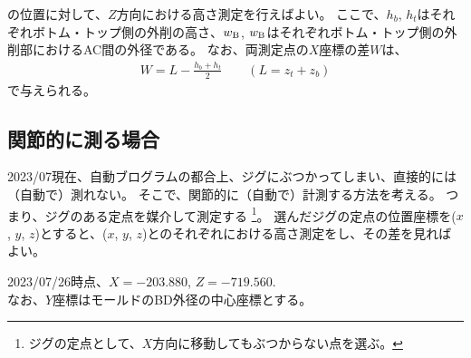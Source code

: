 の位置に対して、$Z$方向における高さ測定を行えばよい。
ここで、$h_b$, $h_t$はそれぞれボトム・トップ側の外削の高さ、$w_\text B$, $w_\text B$はそれぞれボトム・トップ側の外削部におけるAC間の外径である。
なお、両測定点の$X$座標の差$W$は、
\begin{align*}
  W = L-\frac{h_b+h_t}2 \qquad \left(L = z_t + z_b\right)
\end{align*}
で与えられる。



\subsection{関節的に測る場合}
2023/07現在、自動ブログラムの都合上、ジグにぶつかってしまい、直接的には（自動で）測れない。
そこで、関節的に（自動で）計測する方法を考える。
つまり、ジグのある定点を媒介して測定する
\footnote{ジグの定点として、$X$方向に移動してもぶつからない点を選ぶ。}。
選んだジグの定点の位置座標を($x$, $y$, $z$)とすると、($x$, $y$, $z$)とのそれぞれにおける高さ測定をし、その差を見ればよい。
\begin{tcolorbox}[fonttitle=\gtfamily\bfseries]
2023/07/26時点、$X = -203.880$, $Z = -719.560$.\\
なお、$Y$座標はモールドのBD外径の中心座標とする。
\end{tcolorbox}




%




